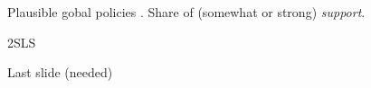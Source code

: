 \documentclass[aspectratio=169,xcolor=dvipsnames, 11pt,mathserif]{beamer}
\begin{document}
\begin{frame}{Plausible gobal policies\label{solidarity_support_absolute} .\hyperlink{solidarity_support_relative}{}}
\centering Share of (somewhat or strong) \textit{support}. \\
\end{frame}


\begin{frame}{2SLS\label{2SLS}  \hyperlink{warm_glow}{}}  
  \small 
\end{frame}


\begin{frame}{Last slide (needed)}
  
\end{frame}


			

\end{document}
